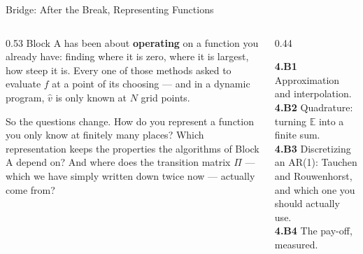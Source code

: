 \begin{frame}{Bridge: After the Break, Representing Functions}
\begin{columns}[T]
\begin{column}{0.53\textwidth}
\small
Block A has been about \textbf{operating} on a function you already have: finding where it is zero, where it is largest, how steep it is. Every one of those methods asked to evaluate $f$ at a point of its choosing --- and in a dynamic program, $\hat v$ is only known at $N$ grid points.
\medskip

So the questions change. How do you represent a function you only know at finitely many places? Which representation keeps the properties the algorithms of Block A depend on? And where does the transition matrix $\Pi$ --- which we have simply written down twice now --- actually come from?
\end{column}
\begin{column}{0.44\textwidth}
\begin{conceptbox}[title=\textbf{After the break (Block B)}]\small
\textbf{4.B1} Approximation and interpolation.\\[1mm]
\textbf{4.B2} Quadrature: turning $\mathbb{E}$ into a finite sum.\\[1mm]
\textbf{4.B3} Discretizing an AR(1): Tauchen and Rouwenhorst, and which one you should actually use.\\[1mm]
\textbf{4.B4} The pay-off, measured.
\end{conceptbox}
\end{column}
\end{columns}
\end{frame}


